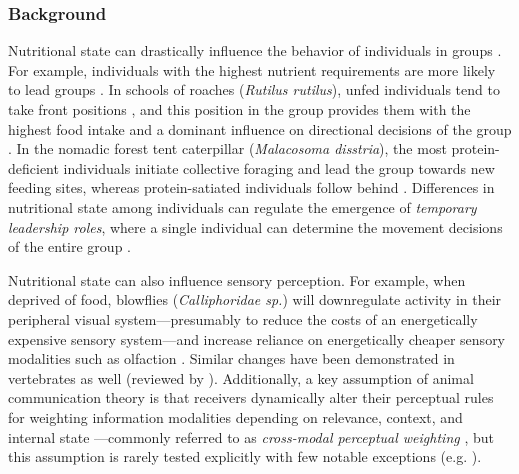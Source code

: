 \documentclass[11pt,a4paper,oneside]{article}
\begin{document}
\subsubsection{Background}
Nutritional state can drastically influence the behavior of individuals in groups \citep{lihoreau2015nutritional}. For example, individuals with the highest nutrient requirements are more likely to lead groups \citep{krause1992relationship,fischhoff2007social,mcclure2011group}. In schools of roaches (\textit{Rutilus rutilus}), unfed individuals tend to take front positions \citep{krause1992relationship}, and this position in the group provides them with the highest food intake and a dominant influence on directional decisions of the group \citep{bumann1993front}. In the nomadic forest tent caterpillar (\textit{Malacosoma disstria}), the most protein-deficient individuals initiate collective foraging and lead the group towards new feeding sites, whereas protein-satiated individuals follow behind \citep{mcclure2011group}. Differences in nutritional state among individuals can regulate the emergence of \textit{temporary leadership roles}, where a single individual can determine the movement decisions of the entire group \citep{sumpter2010collective}. 
\par
Nutritional state can also influence sensory perception. For example, when deprived of food, blowflies (\textit{Calliphoridae sp.}) will downregulate activity in their peripheral visual system---presumably to reduce the costs of an energetically expensive sensory system---and increase reliance on energetically cheaper sensory modalities such as olfaction \citep{longden2014nutritional}. Similar changes have been demonstrated in vertebrates as well (reviewed by \citealp{longden2014nutritional}). Additionally, a key assumption of animal communication theory is that receivers dynamically alter their perceptual rules for weighting information modalities depending on relevance, context, and internal state \citep{hebets2016systems}---commonly referred to as \textit{cross-modal perceptual weighting} \citep{stein2012new}, but this assumption is rarely tested explicitly with few notable exceptions (e.g. \citealp{gomes2016bats}).
\par
\end{document}
